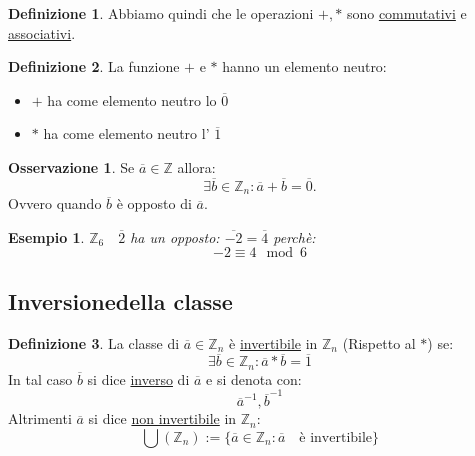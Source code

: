 \documentclass{article}
\newtheorem{exmp}{Esempio}[section]
\theoremstyle{definition}
\newtheorem{definition}{Definizione}[section]
\newtheorem{oss}{Osservazione}[section]
\begin{document}
\begin{definition}
        Abbiamo quindi che le operazioni $+ , *$ sono \underline{commutativi} e \underline{associativi}. 
\end{definition}


\begin{definition}
        La funzione $+$ e $ * $ hanno un elemento neutro:
        \begin{itemize}
                \item $+$ ha come elemento neutro lo $\overline{0}$ 
                \item $*$ ha come elemento neutro l' $\overline{1}$ 
        \end{itemize}
\end{definition}

\begin{tcolorbox}
\begin{oss}
        Se $\overline{a} \in \mathbb{Z}$ allora:
        \begin{equation*}
                \exists \overline{b} \in \mathbb{Z}_n : \overline{a} + \overline{b} = \overline{0}.
        \end{equation*}
        Ovvero quando $ \overline{b}$ è opposto di $\overline{a}$.
\end{oss}
\end{tcolorbox}


\begin{exmp}
        $ \mathbb{Z}_6 \quad \overline{2}$ ha un opposto: $\overline{-2} = \overline{4}$ perchè:
        \begin{equation*}
                -2 \equiv 4 \mod 6
        \end{equation*}
\end{exmp}



\subsection{Inversionedella classe}
\begin{definition}
        La classe di $\overline{a} \in \mathbb{Z}_n$ è \underline{invertibile} in $ \mathbb{Z}_n $ (Rispetto al $*$) se:
        \begin{equation*}
                \exists \overline{b} \in \mathbb{Z}_n : \overline{a} * \overline{b} = \overline{1}
        \end{equation*}
        In tal caso $\overline{b}$ si dice \underline{inverso} di $\overline{a}$ e si denota con:
        \begin{equation*}
                \overline{a}^{-1}, \overline{b}^{-1}
        \end{equation*}
        Altrimenti $\overline{a}$ si dice \underline{non invertibile} in $\mathbb{Z}_n$:
        \begin{equation*}
                \bigcup(\mathbb{Z}_n) := \{\overline{a} \in \mathbb{Z}_n : \overline{a} \quad \mbox{è invertibile}\} 
        \end{equation*}
\end{definition}
\end{document}
